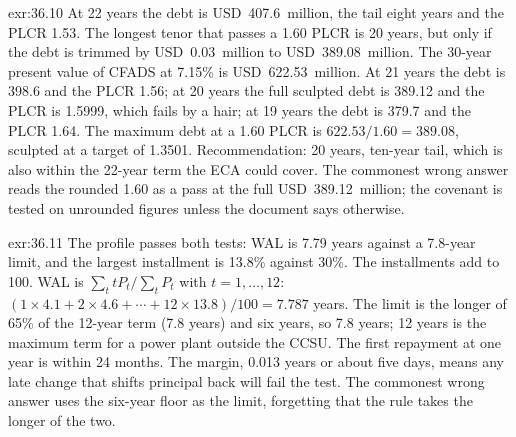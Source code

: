 \begin{solution}{exr:36.10}
At 22 years the debt is USD~407.6~million, the tail eight years and the PLCR 1.53\x. The longest tenor that passes a 1.60\x{} PLCR is 20 years, but only if the debt is trimmed by USD~0.03~million to USD~389.08~million. The 30-year present value of CFADS at 7.15\% is USD~622.53~million. At 21 years the debt is 398.6 and the PLCR 1.56\x; at 20 years the full sculpted debt is 389.12 and the PLCR is 1.5999\x, which fails by a hair; at 19 years the debt is 379.7 and the PLCR 1.64\x. The maximum debt at a 1.60\x{} PLCR is $622.53/1.60 = 389.08$, sculpted at a target of 1.3501\x. Recommendation: 20 years, ten-year tail, which is also within the 22-year term the ECA could cover. The commonest wrong answer reads the rounded 1.60\x{} as a pass at the full USD~389.12~million; the covenant is tested on unrounded figures unless the document says otherwise.
\end{solution}

\begin{solution}{exr:36.11}
The profile passes both tests: WAL is 7.79 years against a 7.8-year limit, and the largest installment is 13.8\% against 30\%. The installments add to 100. WAL is $\sum_t t P_t / \sum_t P_t$ with $t = 1, \ldots, 12$: $(1 \times 4.1 + 2 \times 4.6 + \cdots + 12 \times 13.8)/100 = 7.787$ years. The limit is the longer of 65\% of the 12-year term (7.8 years) and six years, so 7.8 years; 12 years is the maximum term for a power plant outside the CCSU. The first repayment at one year is within 24 months. The margin, 0.013 years or about five days, means any late change that shifts principal back will fail the test. The commonest wrong answer uses the six-year floor as the limit, forgetting that the rule takes the longer of the two.
\end{solution}

